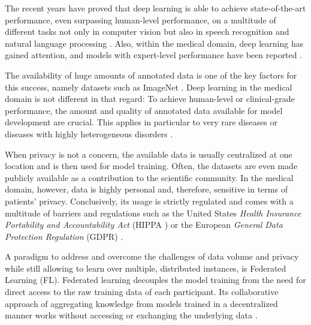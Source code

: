 The recent years have proved that deep learning is able to achieve state-of-the-art performance, even surpassing human-level performance, on a multitude of different tasks not only in computer vision but also in speech recognition and natural language processing \cite{HeDelvingClassification, Hinton2012DeepGroups, Devlin2019BERT:Understanding}. Also, within the medical domain, deep learning has gained attention, and models with expert-level performance have been reported \citep{Esteva2017Dermatologist-levelNetworks}.

The availability of huge amounts of annotated data is one of the key factors for this success, namely datasets such as ImageNet \cite{Deng2009ImageNet:Database}. Deep learning in the medical domain is not different in that regard: To achieve human-level or clinical-grade performance, the amount and quality of annotated data available for model development are crucial. This applies in particular to very rare diseases or diseases with highly heterogeneous disorders \cite{Esteva2017Dermatologist-levelNetworks, DeFauw2018ClinicallyDisease, Dluhos2017Multi-centerApproach}. %


When privacy is not a concern, the available data is usually centralized at one location and is then used for model training. Often, the datasets are even made publicly available as a contribution to the scientific community. In the medical domain, however, data is highly personal and, therefore, sensitive in terms of patients' privacy. Conclusively, its usage is strictly regulated and comes with a multitude of barriers and regulations such as the United States \textit{Health Insurance Portability and Accountability Act} (HIPPA \cite{USDepartmentofHealthandHumanServices2020HealthHIPPA}) or the European \textit{General Data Protection Regulation} (GDPR\cite{IntersoftConsulting2016GeneralGDPR}) \cite{vanPanhuis2014AHealth}.

A paradigm to address and overcome the challenges of data volume and privacy while still allowing to learn over multiple, distributed instances, is Federated Learning (FL). Federated learning decouples the model training from the need for direct access to the raw training data of each participant. Its collaborative approach of aggregating knowledge from models trained in a decentralized manner works without accessing or exchanging the underlying data \cite{BrendanMcMahan2017}.

